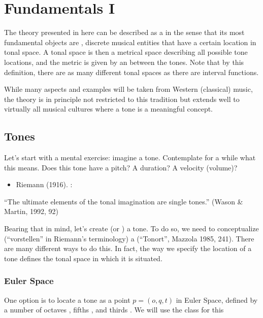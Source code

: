 \documentclass[letterpaper,10pt,english]{sphinxmanual}
\begin{document}
\chapter{Fundamentals I}
\label{\detokenize{2_fundamentals1:module-musictheory}}\label{\detokenize{2_fundamentals1:fundamentals-i}}\label{\detokenize{2_fundamentals1::doc}}
The theory presented in here can be described as a  in the sense
that its most fundamental objects are , discrete musical entities that have
a certain location in tonal space.
A tonal space is then a metrical space describing all possible tone locations,
and the metric is given by an  between the tones. Note that by this definition,
there are as many different tonal spaces as there are interval functions.

While many aspects and examples will be taken
from Western (classical) music, the theory is in principle not restricted to this
tradition but extends well to virtually all musical cultures where a tone is a meaningful concept.


\section{Tones}
\label{\detokenize{2_fundamentals1:tones}}
Let’s start with a mental exercise: imagine a tone.
Contemplate for a while what this means.
Does this tone have a pitch? A duration? A velocity (volume)?
\begin{itemize}
\item {} 
Riemann (1916). :

\end{itemize}

“The ultimate elements of the tonal imagination are single tones.” (Wason \& Martin, 1992, 92)

Bearing that in mind, let’s create (or ) a tone. To do so, we need to
conceptualize (“vorstellen” in Riemann’s terminology) a  (“Tonort”, Mazzola 1985, 241).
There are many different ways to do this. In fact, the way we specify the location of a tone
defines the tonal space in which it is situated.


\subsection{Euler Space}
\label{\detokenize{2_fundamentals1:euler-space}}
One option is to locate a tone  as a point \(p=(o, q, t)\) in Euler Space, defined by
a number of octaves , fifths , and thirds . We will use the {\hyperref[\detokenize{api:musictheory.Tone}]{}}
class for this
\end{document}
